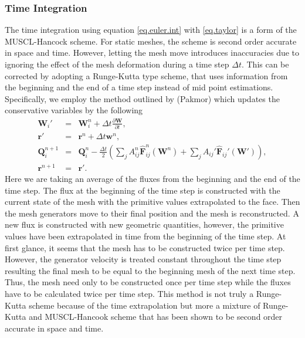 \subsubsection{Time Integration}
\label{sec.time.integration}
The time integration using equation \ref{eq.euler.int} with \ref{eq.taylor} is
a form of the MUSCL-Hancock scheme. For static meshes, the scheme is second
order accurate in space and time. However, letting the mesh move introduces
inaccuracies due to ignoring the effect of the mesh deformation during a time 
step $\Delta t$. This can be corrected by adopting a Runge-Kutta type scheme, that
uses information from the beginning and the end of a time step instead of mid
point estimations. Specifically, we employ the method outlined by (Pakmor)
which updates the conservative variables by the following
\begin{equation}
	\begin{array}{rcl}
		\mathbf{W}_i' & = & \mathbf{W}_i^n + 
        	\Delta t\frac{\partial\mathbf{W}}{\partial t}, \\
        \mathbf{r}' & = & \mathbf{r}^n + \Delta t\mathbf{w}^n, \\
        \mathbf{Q}_i^{n+1} & = & \mathbf{Q}_i^n -
        	\frac{\Delta t}{2}\left(\sum_j A_{ij}^n\mathbf{\hat{F}}_{ij}^n
            (\mathbf{W}^n) + \sum_j A_{ij}'\mathbf{\hat{F}}_{ij}'
            (\mathbf{W}')\right), \\
        \mathbf{r}^{n+1} & = & \mathbf{r}'.
    \end{array}
\end{equation}
Here we are taking an average of the fluxes from the beginning and the end
of the time step. The flux at the beginning of the time step is constructed
with the current state of the mesh with the primitive values extrapolated to
the face. Then the mesh generators move to their final position
and the mesh is reconstructed. A new flux is constructed with new geometric
quantities, however, the primitive values have been extrapolated in time from
the beginning of the time step. At first glance, it seems that the mesh has
to be constructed twice per time step. However, the generator velocity is
treated constant throughout the time step resulting the final mesh to be equal to
the beginning mesh of the next time step. Thus, the mesh need only to
be constructed once per time step while the fluxes have to be calculated
twice per time step. This method is not truly a Runge-Kutta scheme because
of the time extrapolation but more a mixture of Runge-Kutta and MUSCL-Hancook
scheme that has been shown to be second order accurate in space and time.

